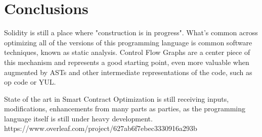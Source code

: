 \chapter*{Conclusions} 

Solidity is still a place where "construction is in progress". What's common across optimizing all of the versions of this programming language is common software techniques, known as static analysis. Control Flow Graphs are a center piece of this mechanism and represents a good starting point, even more valuable when augmented by ASTs and other intermediate representations of the code, such as op code or YUL.

State of the art in Smart Contract Optimization is still receiving inputs, modifications, enhancements from many parts as parties, as the programming language itself is still under heavy development.
https://www.overleaf.com/project/627ab6f7ebec3330916a293b